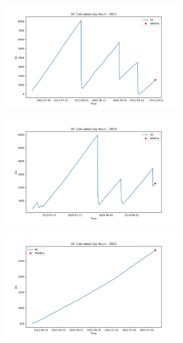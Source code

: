 \begin{figure}[h]
	\centering
	\caption{Calculated hourly DC value for 2015, 2019, and 2022}
	\begin{subfigure}{0.45\textwidth}
		\centering
		\includegraphics[width=\textwidth]{graphs/2015/byHour/2015CalcDC12.png}
	\end{subfigure}
	\hfill
	\begin{subfigure}{0.45\textwidth}
		\centering
		\includegraphics[width=\textwidth]{graphs/2019/2019CalcDC12.png}
	\end{subfigure}
	\hfill
	\begin{subfigure}{0.45\textwidth}
		\centering
		\includegraphics[width=\textwidth]{graphs/2022/2022CalcDC12.png}
	\end{subfigure}
	\label{fig:hourly_dc}
\end{figure}

